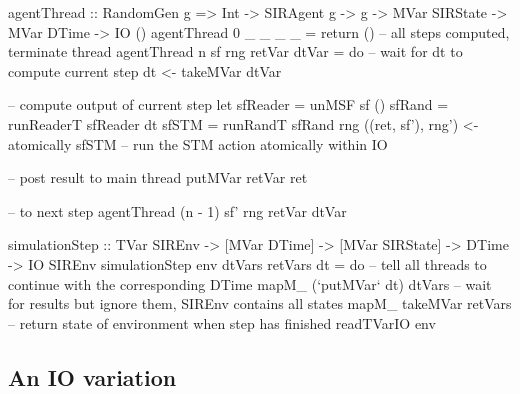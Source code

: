 \begin{HaskellCode}
agentThread :: RandomGen g 
            => Int
            -> SIRAgent g
            -> g
            -> MVar SIRState
            -> MVar DTime
            -> IO ()
agentThread 0 _ _ _ _ = return () -- all steps computed, terminate thread
agentThread n sf rng retVar dtVar = do
  -- wait for dt to compute current step
  dt <- takeMVar dtVar

  -- compute output of current step
  let sfReader = unMSF sf ()
      sfRand   = runReaderT sfReader dt
      sfSTM    = runRandT sfRand rng
  ((ret, sf'), rng') <- atomically sfSTM -- run the STM action atomically within IO

  -- post result to main thread
  putMVar retVar ret
  
  -- to next step
  agentThread (n - 1) sf' rng retVar dtVar
\end{HaskellCode}

\begin{HaskellCode}
simulationStep :: TVar SIREnv
               -> [MVar DTime]
               -> [MVar SIRState]
               -> DTime
               -> IO SIREnv
simulationStep env dtVars retVars dt = do
  -- tell all threads to continue with the corresponding DTime
  mapM_ (`putMVar` dt) dtVars
  -- wait for results but ignore them, SIREnv contains all states
  mapM_ takeMVar retVars
  -- return state of environment when step has finished
  readTVarIO env
\end{HaskellCode}

\subsection{An IO variation}